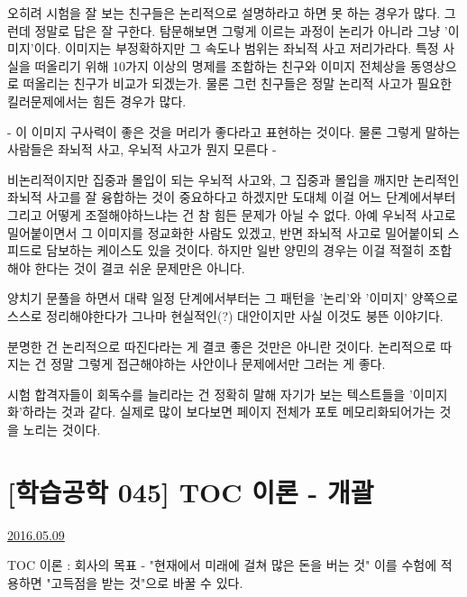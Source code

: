 오히려 시험을 잘 보는 친구들은 논리적으로 설명하라고 하면 못 하는 경우가 많다. 그런데 정말로 답은 잘 구한다.
탐문해보면 그렇게 이르는 과정이 논리가 아니라 그냥 '이미지'이다. 이미지는 부정확하지만 그 속도나 범위는 좌뇌적 사고 저리가라다.
특정 사실을 떠올리기 위해 10가지 이상의 명제를 조합하는 친구와 이미지 전체상을 동영상으로 떠올리는 친구가 비교가 되겠는가.
물론 그런 친구들은 정말 논리적 사고가 필요한 킬러문제에서는 힘든 경우가 많다.
\vspace{5mm}

- 이 이미지 구사력이 좋은 것을 머리가 좋다라고 표현하는 것이다. 물론 그렇게 말하는 사람들은 좌뇌적 사고, 우뇌적 사고가 뭔지 모른다 -
\vspace{5mm}

비논리적이지만 집중과 몰입이 되는 우뇌적 사고와, 그 집중과 몰입을 깨지만 논리적인 좌뇌적 사고를 잘 융합하는 것이 중요하다고 하겠지만
도대체 이걸 어느 단계에서부터 그리고 어떻게 조절해야하느냐는 건 참 힘든 문제가 아닐 수 없다.
아예 우뇌적 사고로 밀어붙이면서 그 이미지를 정교화한 사람도 있겠고, 반면 좌뇌적 사고로 밀어붙이되 스피드로 담보하는 케이스도 있을 것이다.
하지만 일반 양민의 경우는 이걸 적절히 조합해야 한다는 것이 결코 쉬운 문제만은 아니다.
\vspace{5mm}

양치기 문풀을 하면서 대략 일정 단계에서부터는 그 패턴을 '논리'와 '이미지' 양쪽으로 스스로 정리해야한다가 그나마 현실적인(?) 대안이지만
사실 이것도 붕뜬 이야기다.
\vspace{5mm}

분명한 건 논리적으로 따진다라는 게 결코 좋은 것만은 아니란 것이다.
논리적으로 따지는 건 정말 그렇게 접근해야하는 사안이나 문제에서만 그러는 게 좋다.
\vspace{5mm}

시험 합격자들이 회독수를 늘리라는 건 정확히 말해 자기가 보는 텍스트들을 '이미지화'하라는 것과 같다.
실제로 많이 보다보면 페이지 전체가 포토 메모리화되어가는 것을 노리는 것이다.
\vspace{5mm}






\section{[학습공학 045] TOC 이론 - 개괄}
\href{https://www.kockoc.com/Apoc/766549}{2016.05.09}

\vspace{5mm}

TOC 이론 : 회사의 목표 - "현재에서 미래에 걸쳐 많은 돈을 버는 것"
이를 수험에 적용하면 "고득점을 받는 것"으로 바꿀 수 있다.
\vspace{5mm}

